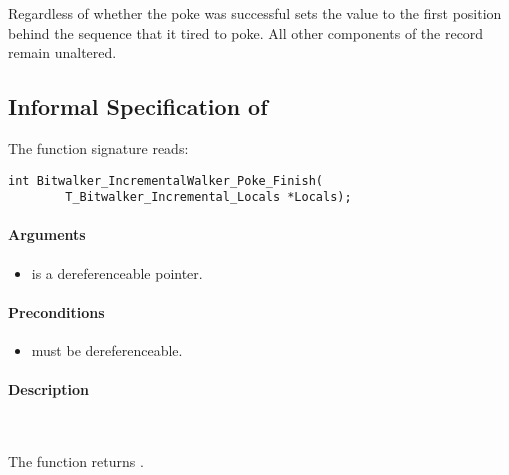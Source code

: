 Regardless of whether the poke was successful \pokenext sets the value   to the first position behind the sequence that it tired to poke.
 All other components of the record  remain unaltered.



\clearpage

\subsection{Informal Specification of }

 The function signature reads:\\[1em]

\begin{lstlisting}[style=acsl-block]
int Bitwalker_IncrementalWalker_Poke_Finish(
        T_Bitwalker_Incremental_Locals *Locals);
\end{lstlisting}

\paragraph{Arguments}
\begin{itemize}
   \item  {} is a dereferenceable pointer.
\end{itemize}

\paragraph{Preconditions}
\begin{itemize}
    \item  {} must be dereferenceable.
\end{itemize}

\paragraph{Description}~

The function  returns .





